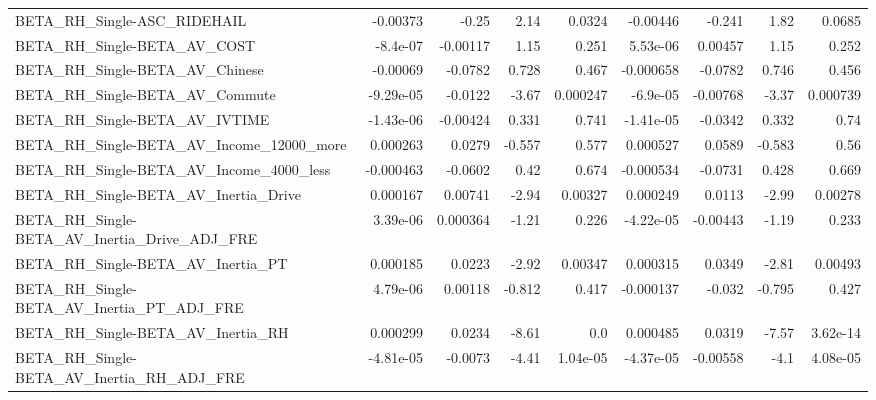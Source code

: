 \begin{tabular}{lrrrrrrrr}
BETA\_RH\_Single-ASC\_RIDEHAIL                        &    -0.00373 &        -0.25 &     2.14 &   0.0324 &   -0.00446 &      -0.241 &         1.82 &        0.0685 \\
BETA\_RH\_Single-BETA\_AV\_COST                        &    -8.4e-07 &     -0.00117 &     1.15 &    0.251 &   5.53e-06 &     0.00457 &         1.15 &         0.252 \\
BETA\_RH\_Single-BETA\_AV\_Chinese                     &    -0.00069 &      -0.0782 &    0.728 &    0.467 &  -0.000658 &     -0.0782 &        0.746 &         0.456 \\
BETA\_RH\_Single-BETA\_AV\_Commute                     &   -9.29e-05 &      -0.0122 &    -3.67 & 0.000247 &   -6.9e-05 &    -0.00768 &        -3.37 &      0.000739 \\
BETA\_RH\_Single-BETA\_AV\_IVTIME                      &   -1.43e-06 &     -0.00424 &    0.331 &    0.741 &  -1.41e-05 &     -0.0342 &        0.332 &          0.74 \\
BETA\_RH\_Single-BETA\_AV\_Income\_12000\_more           &    0.000263 &       0.0279 &   -0.557 &    0.577 &   0.000527 &      0.0589 &       -0.583 &          0.56 \\
BETA\_RH\_Single-BETA\_AV\_Income\_4000\_less            &   -0.000463 &      -0.0602 &     0.42 &    0.674 &  -0.000534 &     -0.0731 &        0.428 &         0.669 \\
BETA\_RH\_Single-BETA\_AV\_Inertia\_Drive               &    0.000167 &      0.00741 &    -2.94 &  0.00327 &   0.000249 &      0.0113 &        -2.99 &       0.00278 \\
BETA\_RH\_Single-BETA\_AV\_Inertia\_Drive\_ADJ\_FRE       &    3.39e-06 &     0.000364 &    -1.21 &    0.226 &  -4.22e-05 &    -0.00443 &        -1.19 &         0.233 \\
BETA\_RH\_Single-BETA\_AV\_Inertia\_PT                  &    0.000185 &       0.0223 &    -2.92 &  0.00347 &   0.000315 &      0.0349 &        -2.81 &       0.00493 \\
BETA\_RH\_Single-BETA\_AV\_Inertia\_PT\_ADJ\_FRE          &    4.79e-06 &      0.00118 &   -0.812 &    0.417 &  -0.000137 &      -0.032 &       -0.795 &         0.427 \\
BETA\_RH\_Single-BETA\_AV\_Inertia\_RH                  &    0.000299 &       0.0234 &    -8.61 &      0.0 &   0.000485 &      0.0319 &        -7.57 &      3.62e-14 \\
BETA\_RH\_Single-BETA\_AV\_Inertia\_RH\_ADJ\_FRE          &   -4.81e-05 &      -0.0073 &    -4.41 & 1.04e-05 &  -4.37e-05 &    -0.00558 &         -4.1 &      4.08e-05 \\

\end{tabular}
